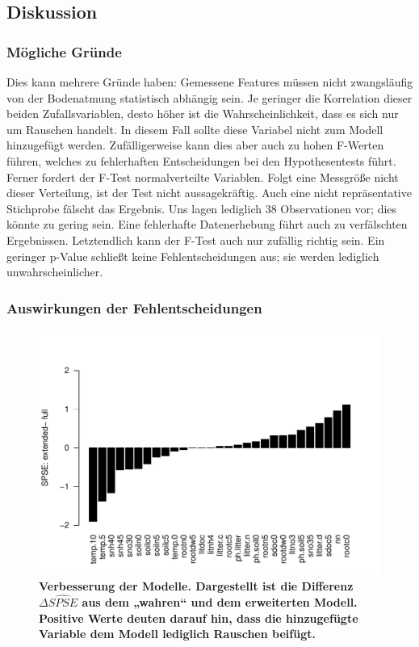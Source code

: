 \subsection{Diskussion}

\subsubsection{Mögliche Gründe}
Dies kann mehrere Gründe haben:
Gemessene Features müssen nicht zwangsläufig von der Bodenatmung statistisch abhängig sein.
Je geringer die Korrelation dieser beiden Zufallsvariablen, desto höher ist die Wahrscheinlichkeit, dass es sich nur um Rauschen handelt.
In diesem Fall sollte diese Variabel nicht zum Modell hinzugefügt werden.
Zufälligerweise kann dies aber auch zu hohen F-Werten führen, welches zu fehlerhaften Entscheidungen bei den Hypothesentests führt.
Ferner fordert der F-Test normalverteilte Variablen.
Folgt eine Messgröße nicht dieser Verteilung, ist der Test nicht aussagekräftig.
Auch eine nicht repräsentative Stichprobe fälscht das Ergebnis.
Uns lagen lediglich 38 Observationen vor; dies könnte zu gering sein.
Eine fehlerhafte Datenerhebung führt auch zu verfälschten Ergebnissen.
Letztendlich kann der F-Test auch nur zufällig richtig sein.
Ein geringer p-Value schließt keine Fehlentscheidungen aus; sie werden lediglich unwahrscheinlicher.

\subsubsection{Auswirkungen der Fehlentscheidungen}

\begin{figure}[htbp]
	\centering
	\includegraphics[width=\textwidth]{fig/simul/delta-spse.pdf}
	\caption{\bf{Verbesserung der Modelle.} 
		Dargestellt ist die Differenz $\Delta \widehat{SPSE}$ aus dem „wahren“ und dem erweiterten Modell.
		Positive Werte deuten darauf hin, dass die hinzugefügte Variable dem Modell lediglich Rauschen beifügt.
	}
	\label{fig-simul-delta-spse}
\end{figure}
